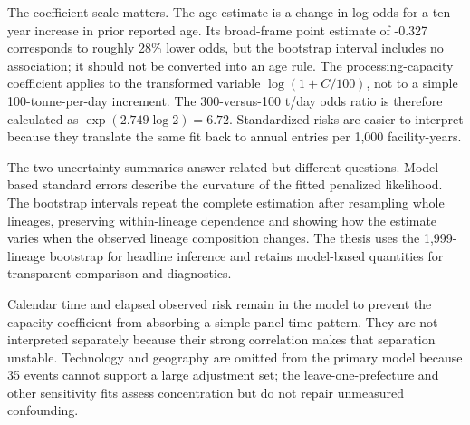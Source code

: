 \documentclass[12pt,letterpaper]{article}
\begin{document}
The coefficient scale matters. The age estimate is a change in log odds for a
ten-year increase in prior reported age. Its broad-frame point estimate of
-0.327 corresponds to roughly 28\% lower odds, but the bootstrap interval
includes no association; it should not be converted into an age rule. The
processing-capacity coefficient applies to the transformed variable
$\log(1+C/100)$, not to a simple 100-tonne-per-day increment. The
300-versus-100 t/day odds ratio is therefore calculated as
$\exp(2.749\log 2)=6.72$. Standardized risks are easier to interpret because
they translate the same fit back to annual entries per 1,000 facility-years.

The two uncertainty summaries answer related but different questions.
Model-based standard errors describe the curvature of the fitted penalized
likelihood. The bootstrap intervals repeat the complete estimation after
resampling whole lineages, preserving within-lineage dependence and showing how
the estimate varies when the observed lineage composition changes. The thesis
uses the 1,999-lineage bootstrap for headline inference and retains model-based
quantities for transparent comparison and diagnostics.

Calendar time and elapsed observed risk remain in the model to prevent the
capacity coefficient from absorbing a simple panel-time pattern. They are not
interpreted separately because their strong correlation makes that separation
unstable. Technology and geography are omitted from the primary model because
35 events cannot support a large adjustment set; the leave-one-prefecture and
other sensitivity fits assess concentration but do not repair unmeasured
confounding.
\end{document}
